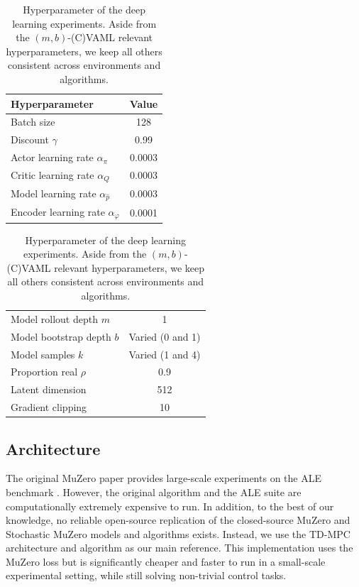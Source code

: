 \begin{table}[]
    \centering
    \begin{tabular}{l|c}
    Hyperparameter & Value \\\hline
    Batch size & 128\\
    Discount $\gamma$ & 0.99 \\
    Actor learning rate $\alpha_\pi$  & 0.0003 \\
    Critic learning rate $\alpha_Q$ & 0.0003 \\
    Model learning rate $\alpha_{\hat{p}}$  & 0.0003 \\
    Encoder learning rate $\alpha_\varphi$ & 0.0001 \\
    \end{tabular}
    \begin{tabular}{l|c}
     \\
    Model rollout depth $m$ & 1 \\
    Model bootstrap depth $b$ & Varied (0 and 1) \\
    Model samples $k$ & Varied (1 and 4) \\
    Proportion real $\rho$ & 0.9 \\
    Latent dimension & 512 \\
    Gradient clipping & 10 \\
    \end{tabular}
    \caption{Hyperparameter of the deep learning experiments. Aside from the $(m,b)$-(C)VAML relevant hyperparameters, we keep all others consistent across environments and algorithms.}
    \label{tab:hyperparams}
\end{table}

\subsection{Architecture}
The original MuZero paper \parencite{schrittwieser2020mastering} provides large-scale experiments on the ALE benchmark \parencite{bellemare13arcade}.
However, the original algorithm and the ALE suite are computationally extremely expensive to run.
In addition, to the best of our knowledge, no reliable open-source replication of the closed-source MuZero and Stochastic MuZero models and algorithms exists.
Instead, we use the TD-MPC architecture and algorithm \parencite{hansen2022temporal} as our main reference.
This implementation uses the MuZero loss but is significantly cheaper and faster to run in a small-scale experimental setting, while still solving non-trivial control tasks.


